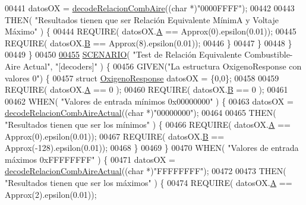 \begin{DoxyCode}
{{{00441             datosOX = \hyperlink{decoders_8cpp_a363bd4f505969098be58a175f02b9b50}{decodeRelacionCombAire}((\textcolor{keywordtype}{char} *)\textcolor{stringliteral}{"0000FFFF"});
00442 
00443             THEN( \textcolor{stringliteral}{"Resultados tienen que ser Relación Equivalente MínimA y Voltaje Máximo"} ) \{
00444                 REQUIRE( datosOX.\hyperlink{structOxigenoResponse_a068c403e5746226cf22bb020b4c786d3}{A} == Approx(0).epsilon(0.01));
00445                 REQUIRE( datosOX.\hyperlink{structOxigenoResponse_a96b19152dd001e19d1351e2d97f22736}{B} == Approx(8).epsilon(0.01));
00446             \}
00447         \}
00448     \}
00449 \}
00450 
\hyperlink{UnitTestCase_8cpp_ab8cb04c98de551d82acba45293028c77}{00455} \hyperlink{UnitTestCase_8cpp_aa6afb62ebdd4c3e07996c995f623eb6b}{SCENARIO}( \textcolor{stringliteral}{"Test de Relación Equivalente Combustible-Aire Actual"}, \textcolor{stringliteral}{"[decoders]"} ) \{
00456     GIVEN(\textcolor{stringliteral}{"La estructura OxigenoResponse con valores 0"}) \{
00457         \textcolor{keyword}{struct }\hyperlink{structOxigenoResponse}{OxigenoResponse} datosOX = \{0,0\};
00458 
00459         REQUIRE( datosOX.\hyperlink{structOxigenoResponse_a068c403e5746226cf22bb020b4c786d3}{A} == 0 );
00460         REQUIRE( datosOX.\hyperlink{structOxigenoResponse_a96b19152dd001e19d1351e2d97f22736}{B} == 0 );
00461 
00462         WHEN( \textcolor{stringliteral}{"Valores de entrada mínimos 0x00000000"} ) \{
00463             datosOX = \hyperlink{decoders_8cpp_a4cedb500095b25b3d4fff382094b0eb9}{decodeRelacionCombAireActual}((\textcolor{keywordtype}{char} *)\textcolor{stringliteral}{"00000000"});
00464 
00465             THEN( \textcolor{stringliteral}{"Resultados tienen que ser los mínimos"} ) \{
00466                 REQUIRE( datosOX.\hyperlink{structOxigenoResponse_a068c403e5746226cf22bb020b4c786d3}{A} == Approx(0).epsilon(0.01));
00467                 REQUIRE( datosOX.\hyperlink{structOxigenoResponse_a96b19152dd001e19d1351e2d97f22736}{B} == Approx(-128).epsilon(0.01));
00468             \}
00469         \}
00470         WHEN( \textcolor{stringliteral}{"Valores de entrada máximos 0xFFFFFFFF"} ) \{
00471             datosOX = \hyperlink{decoders_8cpp_a4cedb500095b25b3d4fff382094b0eb9}{decodeRelacionCombAireActual}((\textcolor{keywordtype}{char} *)\textcolor{stringliteral}{"FFFFFFFF"});
00472 
00473             THEN( \textcolor{stringliteral}{"Resultados tienen que ser los máximos"} ) \{
00474                 REQUIRE( datosOX.\hyperlink{structOxigenoResponse_a068c403e5746226cf22bb020b4c786d3}{A} == Approx(2).epsilon(0.01));
}}}
\end{DoxyCode}
